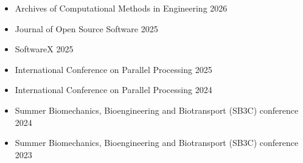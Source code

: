 \begin{itemize}
\item Archives of Computational Methods in Engineering \hfill 2026
\item Journal of Open Source Software \hfill 2025
\item SoftwareX \hfill 2025
\item International Conference on Parallel Processing \hfill 2025
\item International Conference on Parallel Processing \hfill 2024
\item Summer Biomechanics, Bioengineering and Biotransport (SB3C) conference \hfill 2024
\item Summer Biomechanics, Bioengineering and Biotransport (SB3C) conference \hfill 2023
\end{itemize}
